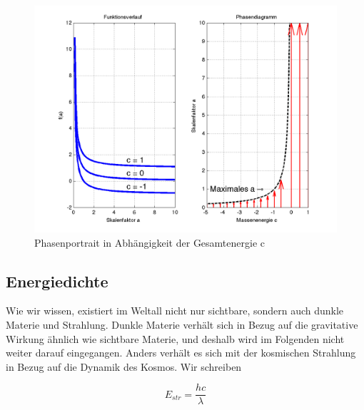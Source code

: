 \begin{refsection}
\begin{enumerate}
\end{enumerate}

\begin{figure}[h]
	\centering
	\includegraphics[width  = \textwidth]{friedmann/images/phasendiagramm.png}
	\caption{Phasenportrait in Abhängigkeit der Gesamtenergie c
		\label{friedmann:phasenportrait}}
\end{figure}%

%
	

\subsection*{Energiedichte}
Wie wir wissen, existiert im Weltall nicht nur sichtbare, sondern auch dunkle Materie und Strahlung. Dunkle Materie verhält sich in Bezug auf die gravitative Wirkung ähnlich wie sichtbare Materie, und deshalb wird im Folgenden nicht weiter darauf eingegangen.
Anders verhält es sich mit der kosmischen Strahlung in Bezug auf die Dynamik des Kosmos. Wir schreiben


\[ E_{str} = \frac{h c}{\lambda} \]


\end{refsection}
